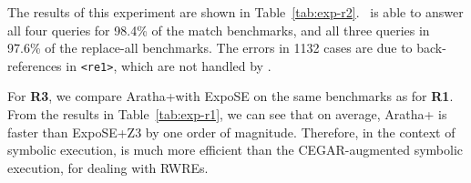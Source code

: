 The results of this experiment are shown in
Table~\ref{tab:exp-r2}. \ostrich\ is able to answer all four queries
for 98.4\% of the match benchmarks, and all three queries in 97.6\% of
the replace-all benchmarks. The errors in 1132 cases are due to
back-references in \verb!<re1>!, which are not handled by \ostrich.

For \textbf{R3}, we compare Aratha+\ostrich with ExpoSE on the same
benchmarks as for \textbf{R1}.  From the results in
Table~\ref{tab:exp-r1}, we can see that on average, Aratha+{\ostrich}
is faster than ExpoSE+Z3 by one order of magnitude. Therefore, in the
context of symbolic execution, {\ostrich} is much more efficient than
the CEGAR-augmented symbolic execution, for dealing with RWREs.
